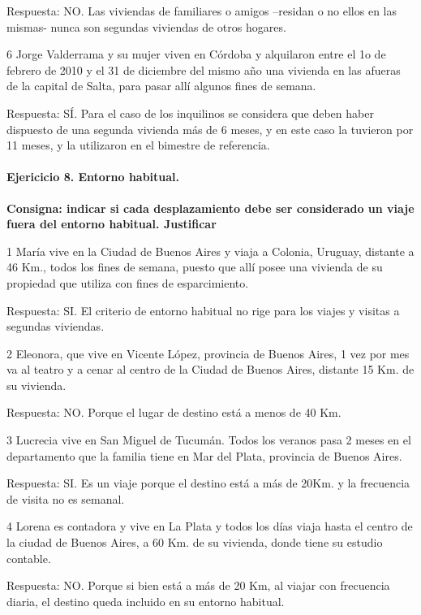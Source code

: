 \documentclass[
  openany]{book}
\begin{document}
Respuesta: NO. Las viviendas de familiares o amigos --residan o no ellos en las mismas- nunca son segundas viviendas de otros hogares.

6 Jorge Valderrama y su mujer viven en Córdoba y alquilaron entre el 1o de febrero de 2010 y el 31 de diciembre del mismo año una vivienda en las afueras de la capital de Salta, para pasar allí algunos fines de semana.

Respuesta: SÍ. Para el caso de los inquilinos se considera que deben haber dispuesto de una segunda vivienda más de 6 meses, y en este caso la tuvieron por 11 meses, y la utilizaron en el bimestre de referencia.

\hypertarget{ejericicio-8.-entorno-habitual.}{%
\paragraph{Ejericicio 8. Entorno habitual.}\label{ejericicio-8.-entorno-habitual.}}

\textbf{Consigna: indicar si cada desplazamiento debe ser considerado un viaje fuera del entorno habitual. Justificar}

1 María vive en la Ciudad de Buenos Aires y viaja a Colonia, Uruguay, distante a 46 Km., todos los fines de semana, puesto que allí posee una vivienda de su propiedad que utiliza con fines de esparcimiento.

Respuesta: SI. El criterio de entorno habitual no rige para los viajes y visitas a segundas viviendas.

2 Eleonora, que vive en Vicente López, provincia de Buenos Aires, 1 vez por mes va al teatro y a cenar al centro de la Ciudad de Buenos Aires, distante 15 Km. de su vivienda.

Respuesta: NO. Porque el lugar de destino está a menos de 40 Km.

3 Lucrecia vive en San Miguel de Tucumán. Todos los veranos pasa 2 meses en el departamento que la familia tiene en Mar del Plata, provincia de Buenos Aires.

Respuesta: SI. Es un viaje porque el destino está a más de 20Km. y la frecuencia de visita no es semanal.

4 Lorena es contadora y vive en La Plata y todos los días viaja hasta el centro de la ciudad de Buenos Aires, a 60 Km. de su vivienda, donde tiene su estudio contable.

Respuesta: NO. Porque si bien está a más de 20 Km, al viajar con frecuencia diaria, el destino queda incluido en su entorno habitual.
\end{document}
